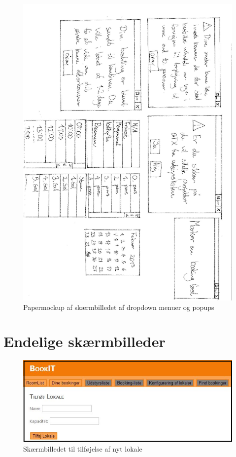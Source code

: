 \begin{figure}[h!]
  \centering
    \includegraphics[angle=180, width=\textwidth]{Appendix/GUI-Prototype/PaperMockup/PopUpDropDowns_002}
  \caption{Papermockup af skærmbilledet af dropdown menuer og popups}
\label{App_GUI_paper_PopUpDropDowns}
\end{figure}

\clearpage
\section{Endelige skærmbilleder}
\label{App_GUI_final}

\begin{figure}[h!]
  \centering
    \includegraphics[angle=90, height=0.8\textheight]{Appendix/GUI-Prototype/DigitalMockup/AddRoom}
  \caption{Skærmbilledet til tilføjelse af nyt lokale}
\label{App_GUI_final_AddRoom}
\end{figure}

